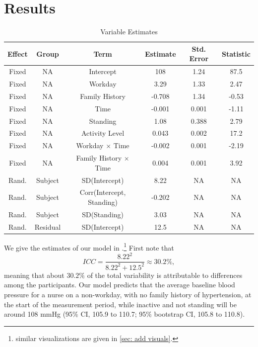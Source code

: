 \documentclass[12pt,twoside,letterpaper]{article}
\theoremstyle{definition}
\theoremstyle{definition}
\begin{document}
\section{Results}\label{sec: results}

\begin{table} 
    \centering\begin{tabular}{|c|c|c||c|c|c|}
        \hline
        Effect & Group & Term & Estimate & Std. Error & Statistic \\
        \hline\hline
        Fixed & NA & Intercept & 108 & 1.24 & 87.5 \\
        \hline
        Fixed & NA & Workday & 3.29  &   1.33  &       2.47  \\
        \hline
        Fixed & NA & Family History & -0.708 &   1.34    &    -0.53 \\
        \hline
        Fixed & NA & Time & -0.001 &  0.001  &  -1.11 \\
        \hline
        Fixed & NA & Standing & 1.08  &   0.388    &    2.79 \\
        \hline
        Fixed & NA & Activity Level & 0.043 &  0.002  &   17.2  \\
        \hline
        Fixed & NA & Workday $\times$ Time & -0.002 & 0.001   &  -2.19 \\
        \hline
        Fixed & NA & Family History $\times$ Time & 0.004 & 0.001   &   3.92  \\
        \hline\hline
        Rand. & Subject & SD(Intercept) & 8.22  &  NA     &      NA  \\
        \hline  
        Rand. & Subject & Corr(Intercept, Standing) & -0.202  &  NA     &      NA  \\
        \hline
        Rand. & Subject & SD(Standing) & 3.03  &  NA     &      NA  \\
        \hline\hline
        Rand. & Residual & SD(Intercept) & 12.5  &  NA     &      NA  \\
        \hline
    \end{tabular}
    \caption{Variable Estimates}
    \label{tab: var est}
\end{table}

We give the estimates of our model in .\footnote{similar visualizations are given in \autoref{sec: add visuals}.} First note that 
\[ICC = \dfrac{8.22^2}{8.22^2 + 12.5^2} \approx 30.2\%,\]
meaning that about $30.2\%$ of the total variability is attributable to differences among the participants. Our model predicts that the average baseline blood pressure for a nurse on a non-workday, with no family history of hypertension, at the start of the measurement period, while inactive and not standing will be around 108 mmHg (95\% CI, 105.9 to 110.7; 95\% bootstrap CI, 105.8 to 110.8).
\end{document}
